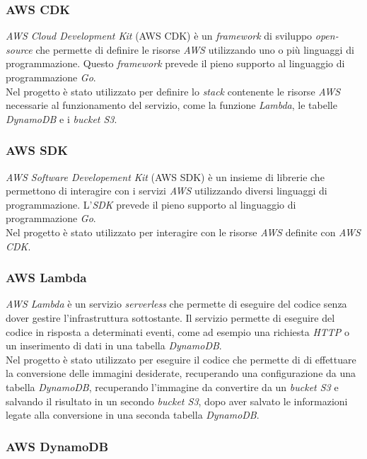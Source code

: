\subsubsection{AWS CDK}

\emph{AWS Cloud Development Kit} (AWS CDK) è un \emph{framework} di sviluppo
\emph{open-source} che permette di definire le risorse \emph{AWS} utilizzando
uno o più linguaggi di programmazione. Questo \emph{framework} prevede il pieno
supporto al linguaggio di programmazione \emph{Go}. \\
Nel progetto è stato utilizzato per definire lo \emph{stack} contenente le risorse \emph{AWS}
necessarie al funzionamento del servizio, come la funzione \emph{Lambda}, le
tabelle \emph{DynamoDB} e i \emph{bucket S3}. \cite{go-aws-cdk}

\subsubsection{AWS SDK}

\emph{AWS Software Developement Kit} (AWS SDK) è un insieme di librerie che
permettono di interagire con i servizi \emph{AWS} utilizzando diversi linguaggi
di programmazione. L'\emph{SDK} prevede il pieno supporto al linguaggio di
programmazione \emph{Go}. \\
Nel progetto è stato utilizzato per interagire con le risorse \emph{AWS}
definite con \emph{AWS CDK}. \cite{go-aws-sdk}

\subsubsection{AWS Lambda}

\emph{AWS Lambda} è un servizio \emph{serverless} che permette di eseguire del
codice senza dover gestire l'infrastruttura sottostante. Il servizio permette di
eseguire del codice in risposta a determinati eventi, come ad esempio una
richiesta \emph{HTTP} o un inserimento di dati in una tabella \emph{DynamoDB}.
\\
Nel progetto è stato utilizzato per eseguire il codice che permette di
di effettuare la conversione delle immagini desiderate, recuperando una
configurazione da una tabella \emph{DynamoDB}, recuperando l'immagine da
convertire da un \emph{bucket S3} e salvando il risultato in un secondo
\emph{bucket S3}, dopo aver salvato le informazioni legate alla conversione in
una seconda tabella \emph{DynamoDB}.

\subsubsection{AWS DynamoDB}

